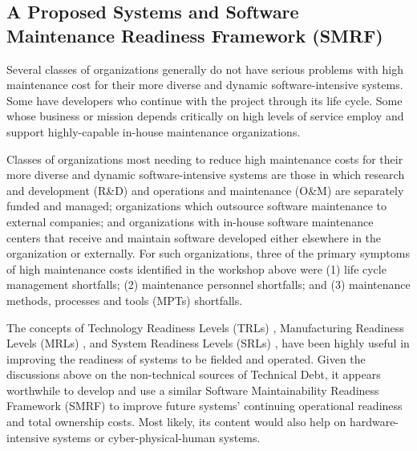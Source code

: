 \subsection{A Proposed Systems and Software Maintenance Readiness Framework (SMRF)}
\label{subsec:smrf}
Several classes of organizations generally do not have serious problems with high maintenance cost for their more diverse and dynamic software-intensive systems. Some have developers who continue with the project through its life cycle. Some whose business or mission depends critically on high levels of service employ and support highly-capable in-house maintenance organizations.

Classes of organizations most needing to reduce high maintenance costs for their more diverse and dynamic software-intensive systems are those in which research and development (R\&D) and operations and maintenance (O\&M) are separately funded and managed; organizations which outsource software maintenance to external companies; and organizations with in-house software maintenance centers that receive and maintain software developed either elsewhere in the organization or externally. For such organizations, three of the primary symptoms of high maintenance costs
identified in the workshop above were
(1) life cycle management shortfalls; (2) maintenance personnel shortfalls; and (3) maintenance methods, processes and tools (MPTs) shortfalls.



The concepts of Technology Readiness Levels (TRLs) \citep{dod2011technology}, Manufacturing Readiness Levels (MRLs) \citep{cundiff2003manufacturing}, and System Readiness Levels (SRLs) \citep{sauser2006trl,sauser2007system}, have been highly useful in improving the readiness of systems to be fielded and operated.  Given the discussions above on the non-technical sources of Technical Debt, it appears worthwhile to develop and use a similar Software Maintainability Readiness Framework (SMRF) to improve future systems' continuing operational readiness and total ownership costs. Most likely, its content would also help on hardware-intensive systems or cyber-physical-human systems.




